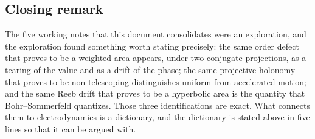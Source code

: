 \subsection{Closing remark}

The five working notes that this document consolidates were an exploration, and
the exploration found something worth stating precisely: the same order defect
that \AEG{} proves to be a weighted area appears, under two conjugate projections,
as a tearing of the value and as a drift of the phase; the same projective
holonomy that \AEG{} proves to be non-telescoping distinguishes uniform from
accelerated motion; and the same Reeb drift that \AEG{} proves to be a hyperbolic
area is the quantity that Bohr--Sommerfeld quantizes.  Those three
identifications are exact.  What connects them to electrodynamics is a
dictionary, and the dictionary is stated above in five lines so that it can be
argued with.
